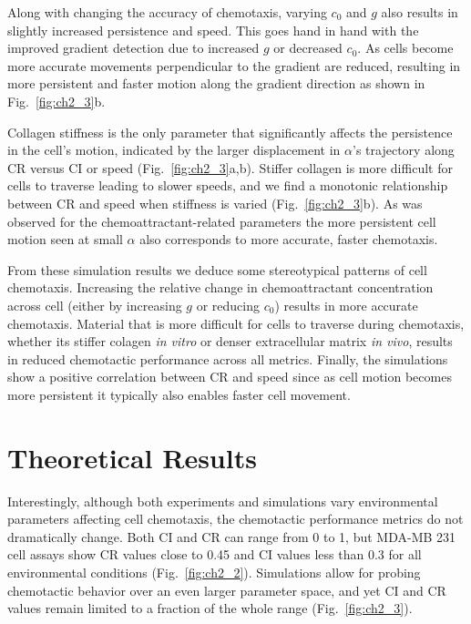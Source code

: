 Along with changing the accuracy of chemotaxis, varying $c_0$ and $g$ also results in slightly increased persistence and speed. This goes hand in hand with the improved gradient detection due to increased $g$ or decreased $c_0$. As cells become more accurate movements perpendicular to the gradient are reduced, resulting in more persistent and faster motion along the gradient direction as shown in Fig.\ \ref{fig:ch2_3}b.

Collagen stiffness is the only parameter that significantly affects the persistence in the cell's motion, indicated by the larger displacement in $\alpha$'s trajectory along CR versus CI or speed (Fig.\ \ref{fig:ch2_3}a,b). Stiffer collagen is more difficult for cells to traverse leading to slower speeds, and we find a monotonic relationship between CR and speed when stiffness is varied (Fig.\ \ref{fig:ch2_3}b). As was observed for the chemoattractant-related parameters the more persistent cell motion seen at small $\alpha$ also corresponds to more accurate, faster chemotaxis.

From these simulation results we deduce some stereotypical patterns of cell chemotaxis. Increasing the relative change in chemoattractant concentration across cell (either by increasing $g$ or reducing $c_0$) results in more accurate chemotaxis. Material that is more difficult for cells to traverse during chemotaxis, whether its stiffer colagen \textit{in vitro} or denser extracellular matrix \textit{in vivo}, results in reduced chemotactic performance across all metrics. Finally, the simulations show a positive correlation between CR and speed since as cell motion becomes more persistent it typically also enables faster cell movement.

\section{Theoretical Results}

Interestingly, although both experiments  and simulations vary environmental parameters affecting cell chemotaxis, the chemotactic performance metrics do not dramatically change. Both CI and CR can range from 0 to 1, but MDA-MB 231 cell assays show CR values close to 0.45 and CI values less than 0.3 for all environmental conditions (Fig.\ \ref{fig:ch2_2}). Simulations allow for probing chemotactic behavior over an even larger parameter space, and yet CI and CR values remain limited to a fraction of the whole range (Fig.\ \ref{fig:ch2_3}).

